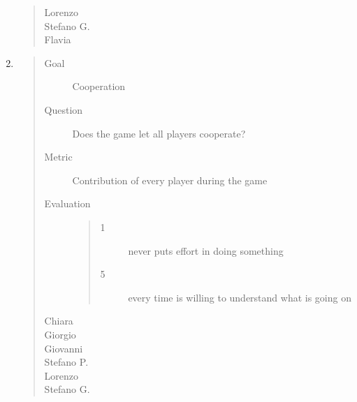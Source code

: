 \documentclass[letterpaper,10pt,italian]{sphinxmanual}
\begin{document}
\begin{enumerate}
\begin{quote}
\begin{description}
\item[{Lorenzo}] \leavevmode
{}

\item[{Stefano G.}] \leavevmode
{}

\item[{Flavia}] \leavevmode
{}

\end{description}\end{quote}

\item {} \begin{quote}\begin{description}
\item[{Goal}] \leavevmode
\sphinxAtStartPar
Cooperation

\item[{Question}] \leavevmode
\sphinxAtStartPar
Does the game let all players cooperate?

\item[{Metric}] \leavevmode
\sphinxAtStartPar
Contribution of every player during the game

\item[{Evaluation}] \leavevmode\begin{quote}\begin{description}
\item[{1}] \leavevmode
\sphinxAtStartPar
never puts effort in doing something

\item[{5}] \leavevmode
\sphinxAtStartPar
every time is willing to understand what is going on

\end{description}\end{quote}

\item[{Chiara}] \leavevmode
{}

\item[{Giorgio}] \leavevmode
{}

\item[{Giovanni}] \leavevmode
{}

\item[{Stefano P.}] \leavevmode
{}

\item[{Lorenzo}] \leavevmode
{}

\item[{Stefano G.}] \leavevmode
{}


\end{description}
\end{quote}
\end{enumerate}
\end{document}
